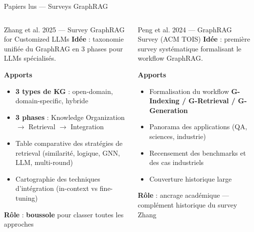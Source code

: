 \documentclass[aspectratio=169,10pt]{beamer}
\begin{document}
\begin{frame}{Papiers lus --- Surveys GraphRAG}
  \begin{columns}[T,onlytextwidth]
    \begin{block}{\small Zhang et al. 2025 --- Survey GraphRAG for Customized LLMs}
    \scriptsize
    \textbf{Idée} : taxonomie unifiée du GraphRAG en 3 phases pour LLMs spécialisés.

    \vspace{0.3em}
    \textbf{Apports}
    \begin{itemize}\setlength\itemsep{-0.1em}
      \item \textbf{3 types de KG} : open-domain, domain-specific, hybride
      \item \textbf{3 phases} : Knowledge Organization $\rightarrow$ Retrieval $\rightarrow$ Integration
      \item Table comparative des stratégies de retrieval (similarité, logique, GNN, LLM, multi-round)
      \item Cartographie des techniques d'intégration (in-context vs fine-tuning)
    \end{itemize}
    \textbf{Rôle} : \textbf{boussole} pour classer toutes les approches
    \end{block}

    \begin{block}{\small Peng et al. 2024 --- GraphRAG Survey (ACM TOIS)}
    \scriptsize
    \textbf{Idée} : première survey systématique formalisant le workflow GraphRAG.

    \vspace{0.3em}
    \textbf{Apports}
    \begin{itemize}\setlength\itemsep{-0.1em}
      \item Formalisation du workflow \textbf{G-Indexing / G-Retrieval / G-Generation}
      \item Panorama des applications (QA, sciences, industrie)
      \item Recensement des benchmarks et des cas industriels
      \item Couverture historique large
    \end{itemize}
    \textbf{Rôle} : ancrage académique --- complément historique du survey Zhang
    \end{block}
  \end{columns}
\end{frame}
\end{document}

